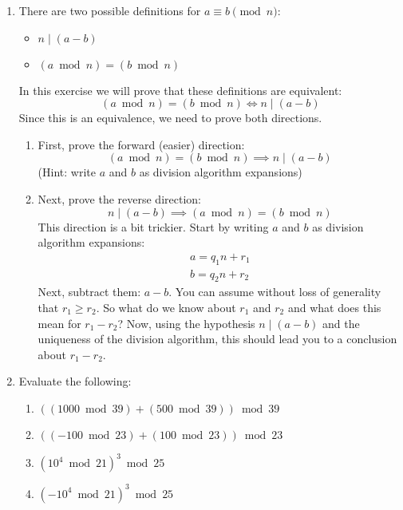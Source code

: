 \documentclass[letterpaper,12pt,fleqn]{article}
\begin{document}
\begin{enumerate}[left=0in,itemsep=0.5in]
\item There are two possible definitions for \(a\equiv b\pmod n\):
  \begin{itemize}
  \item \(n\mid(a-b)\)
  \item \((a\bmod n)=(b\bmod n)\)
  \end{itemize}
  In this exercise we will prove that these definitions are equivalent:
  \[(a\bmod n)=(b\bmod n)\iff n\mid(a-b)\]
  Since this is an equivalence, we need to prove both directions.
  \begin{enumerate}
  \item First, prove the forward (easier) direction:
    \[(a\bmod n)=(b\bmod n)\implies n\mid(a-b)\]
    (Hint: write \(a\) and \(b\) as division algorithm expansions)
  \item Next, prove the reverse direction:
    \[n\mid(a-b)\implies (a\bmod n)=(b\bmod n)\]
    This direction is a bit trickier.  Start by writing \(a\) and \(b\) as division algorithm expansions:
    \begin{gather*}
      a=q_1n+r_1 \\
      b=q_2n+r_2
    \end{gather*}
    Next, subtract them: \(a-b\).  You can assume without loss of generality that \(r_1\ge r_2\).  So what do we
    know about \(r_1\) and \(r_2\) and what does this mean for \(r_1-r_2\)?  Now, using the hypothesis
    \(n\mid(a-b)\) and the uniqueness of the division algorithm, this should lead you to a conclusion about
    \(r_1-r_2\).
  \end{enumerate}

\item Evaluate the following:
  \begin{enumerate}
  \item \(((1000\bmod39)+(500\bmod39))\bmod39\)
  \item \(((-100\bmod23)+(100\bmod23))\bmod23\)
  \item \((10^4\bmod21)^3\bmod25\)
  \item \((-10^4\bmod21)^3\bmod25\)
  \end{enumerate}
\end{enumerate}
\end{document}
